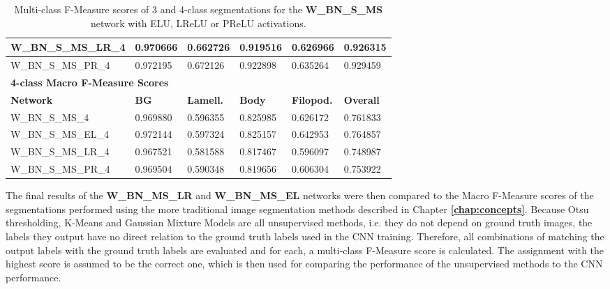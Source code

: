 \begin {table}
\begin{flushleft}
\begin {tabular}[!htb]{|l|l|l|l|l|l|}
			W\_BN\_S\_MS\_LR\_4& 0.970666& 0.662726& 0.919516& 0.626966& 0.926315 \\ \hline
			W\_BN\_S\_MS\_PR\_4& 0.972195& 0.672126& 0.922898& 0.635264& 0.929459 \\ \hline
			\multicolumn{6}{|l|}{\textbf{4-class Macro F-Measure Scores}} \\ \hline
			\textbf{Network}& \textbf{BG}& \textbf{Lamell.}& \textbf{Body}& \textbf{Filopod.}& \textbf{Overall} \\ \hline
			W\_BN\_S\_MS\_4& 0.969880& 0.596355& \cellcolor{green!25}0.825985& 0.626172& 0.761833 \\ \hline
			W\_BN\_S\_MS\_EL\_4& \cellcolor{green!25}0.972144& \cellcolor{green!25}0.597324& 0.825157& \cellcolor{green!25}0.642953& \cellcolor{green!25}0.764857 \\ \hline
			W\_BN\_S\_MS\_LR\_4& 0.967521& 0.581588& 0.817467& 0.596097& 0.748987 \\ \hline
			W\_BN\_S\_MS\_PR\_4& 0.969504& 0.590348& 0.819656& 0.606304& 0.753922 \\ \hline
		\end {tabular}
	\end {flushleft}
\caption[Multi-class F-Measure scores for networks with different activation functions.]{Multi-class F-Measure scores of 3 and 4-class segmentations for the \textbf{W\_BN\_S\_MS} network with ELU, LReLU or PReLU activations.}
\label{tab:results5}
\end {table}


\noindent The final results of the \textbf{W\_BN\_MS\_LR} and \textbf{W\_BN\_MS\_EL} networks were then compared to the Macro F-Measure scores of the segmentations performed using the more traditional image segmentation methods described in Chapter \textbf{\ref{chap:concepts}}. Because Otsu thresholding, K-Means and Gaussian Mixture Models are all unsupervised methods, i.e. they do not depend on ground truth images, the labels they output have no direct relation to the ground truth labels used in the CNN training. Therefore, all combinations of matching the output labels with the ground truth labels are evaluated and for each, a multi-class F-Measure score is calculated. The assignment with the highest score is assumed to be the correct one, which is then used for comparing the performance of the unsupervised methods to the CNN performance.\\


